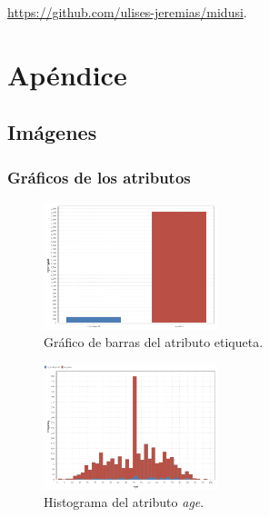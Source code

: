 \documentclass[osajnl,twocolumn,showpacs,superscriptaddress,10pt,floatfix]{revtex4-1} %
\begin{document}
\begin{thebibliography}{99}

 \url{https://github.com/ulises-jeremias/midusi}.

\end{thebibliography}

\clearpage

\onecolumngrid

\section{Apéndice}

\subsection{Imágenes} \label{apendix:images}

\subsubsection{Gráficos de los atributos} \label{apendix:images:attr}

\twocolumngrid

\begin{figure}[H]
    \centering
    \includegraphics[width=0.45\textwidth]{analysis/bars_hypothyroid}
    \caption{Gráfico de barras del atributo etiqueta.}
    \label{figure:bars_hypothyroid}
\end{figure}

\begin{figure}[H]
    \centering
    \includegraphics[width=0.45\textwidth]{analysis/histogram_age}
    \caption{Histograma del atributo \textit{age}.}
    \label{figure:histogram_age}
\end{figure}
\end{document}
